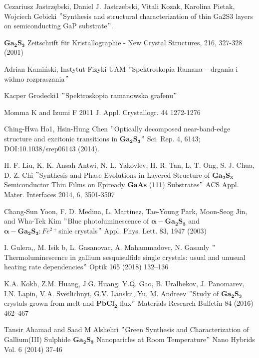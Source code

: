 \newpage
 
\begin{thebibliography}{}
	 Cezariusz Jastrzębski, Daniel J. Jastrzebski, Vitali Kozak, Karolina Pietak, Wojciech Gebicki $"$Synthesis and structural characterization of thin Ga2S3 layers on semiconducting GaP substrate$"$.
	
	 $\mathbf{Ga_{2}S_{3}}$ Zeitschrift für Kristallographie - New Crystal Structures, 216, 327-328 (2001)
	
	 Adrian Kamiński, Instytut Fizyki UAM $"$Spektroskopia Ramana – drgania i widmo rozpraszania$"$
	
	 Kacper Grodecki1 $"$Spektroskopia ramanowska grafenu$"$
	
	 Momma K and Izumi F 2011 J. Appl. Crystallogr. 44 1272-1276
	
	 Ching-Hwa Ho1, Hsin-Hung Chen $"$Optically decomposed near-band-edge structure and excitonic transitions in
	$\mathbf{Ga_{2}S_{3}}$$"$ Sci. Rep. 4, 6143; DOI:10.1038/srep06143
	(2014).
	
	 H. F. Liu, K. K. Ansah Antwi, N. L. Yakovlev, H. R. Tan, L. T. Ong, S. J. Chua, D. Z. Chi $"$Synthesis and Phase Evolutions in Layered Structure of $\mathbf{Ga_{2}S_{3}}$ Semiconductor Thin Films on Epiready $\mathbf{GaAs}$ (111) Substrates$"$ ACS Appl. Mater. Interfaces 2014, 6, 3501-3507
	
	 Chang-Sun Yoon, F. D. Medina, L. Martinez, Tae-Young Park, Moon-Seog Jin, and Wha-Tek Kim $"$Blue photoluminescence of $\mathbf{\alpha-Ga_{2}S_{3}}$ and $\mathbf{\alpha-Ga_{2}S_{3}}:Fe^{2+} $sinle crystals$"$ Appl. Phys. Lett. 83, 1947 (2003)
	
	 I. Gulera,, M. Isik b, L. Gasanovac, A. Mahammadovc, N. Gasanly $"$Thermoluminescence in gallium sesquisulfide single crystals:
	usual and unusual heating rate dependencies$"$ Optik 165 (2018) 132–136
	
	 K.A. Kokh, Z.M. Huang, J.G. Huang, Y.Q. Gao, B. Uralbekov, J. Panomarev, I.N. Lapin, V.A. Svetlichnyi, G.V. Lanskii, Yu. M. Andreev $"$Study of $\mathbf{Ga_{2}S_{3}}$ crystals grown from melt and $\mathbf{PbCl_{2}}$ flux$"$ Materials Research Bulletin 84 (2016) 462–467
	
	 Tansir Ahamad and Saad M Alshehri $"$Green Synthesis and Characterization of Gallium(III) Sulphide $\mathbf{Ga_{2}S_{3}}$
	Nanoparicles at Room Temperature$"$ Nano Hybrids Vol. 6 (2014) 37-46
	

\end{thebibliography}
